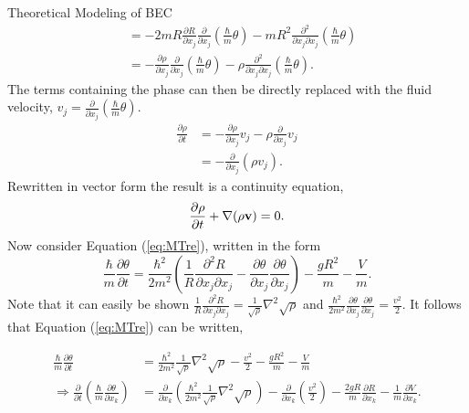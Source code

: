 \begin{chapter}{\label{cha:theoretical_model}Theoretical Modeling of BEC}
\begin{align*}
		&= -2mR\frac{\partial R}{\partial x_j}\frac{\partial}{\partial x_j}\left( \frac{\hbar}{m} \theta \right) - mR^2 \frac{\partial^2}{\partial x_j \partial x_j}\left(\frac{\hbar}{m}\theta \right)\\
		&= -\frac{\partial \rho}{\partial x_j}\frac{\partial}{\partial x_j}\left( \frac{\hbar}{m} \theta \right) - \rho \frac{\partial^2}{\partial x_j \partial x_j}\left(\frac{\hbar}{m}\theta \right).
	\end{align*}
	The terms containing the phase can then be directly replaced with the fluid velocity, $v_j = \frac{\partial}{\partial x_j}\left( \frac{\hbar}{m} \theta \right)$.
	\begin{align*}
		\frac{\partial \rho}{\partial t} &= -\frac{\partial \rho}{\partial x_j} v_j - \rho \frac{\partial}{\partial x_j} v_j\\
										 &= -\frac{\partial}{\partial x_j} \left( \rho v_j \right).
	\end{align*}
	Rewritten in vector form the result is a continuity equation,
	\begin{equation}
		\frac{\partial \rho}{\partial t} + \nabla(\rho{\bf v}) = 0.
		\label{eq:MTcont}
	\end{equation}
	Now consider Equation (\ref{eq:MTre}), written in the form
	\begin{equation*}
	\frac{\hbar}{m} \frac{\partial \theta}{\partial t} = \frac{\hbar^2}{2m^2} \left( \frac{1}{R} \frac{\partial^2 R}{\partial x_j \partial x_j} - \frac{\partial \theta}{\partial x_j}\frac{\partial \theta}{\partial x_j}  \right) - \frac{gR^2}{m} - \frac{V}{m}.
	\end{equation*}
	Note that it can easily be shown $\frac{1}{R} \frac{\partial^2 R}{\partial x_j \partial x_j} = \frac{1}{\sqrt{\rho}}\nabla^2\sqrt{\rho}$ and $\frac{\hbar^2}{2m^2} \frac{\partial \theta}{\partial x_j}\frac{\partial \theta}{\partial x_j} = \frac{v^2}{2} $. It follows that Equation (\ref{eq:MTre}) can be written,

	\begin{align*}
	\frac{\hbar}{m} \frac{\partial \theta}{\partial t} &= \frac{\hbar^2}{2m^2} \frac{1}{\sqrt{\rho}} \nabla^2\sqrt{\rho} - \frac{v^2}{2} - \frac{gR^2}{m} - \frac{V}{m}\\
	\Rightarrow \frac{\partial}{\partial t}\left(\frac{\hbar}{m} \frac{\partial \theta}{\partial x_k}\right) &= \frac{\partial}{\partial x_k}\left(\frac{\hbar^2}{2m^2} \frac{1}{\sqrt{\rho}} \nabla^2\sqrt{\rho} \right)- \frac{\partial}{\partial x_k} \left (\frac{v^2}{2}\right) - \frac{2gR}{m}\frac{\partial R}{\partial x_k} - \frac{1}{m}\frac{\partial V}{\partial x_k}.
	\end{align*}


\end{chapter}
